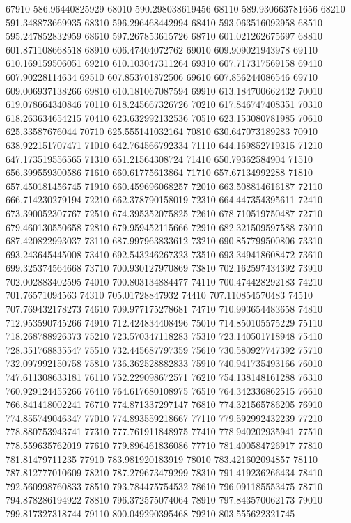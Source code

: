 {67910 586.96440825929
68010 590.298038619456
68110 589.930663781656
68210 591.348873669935
68310 596.296468442994
68410 593.063516092958
68510 595.247852832959
68610 597.267853615726
68710 601.021262675697
68810 601.871108668518
68910 606.47404072762
69010 609.909021943978
69110 610.169159506051
69210 610.103047311264
69310 607.717317569158
69410 607.90228114634
69510 607.853701872506
69610 607.856244086546
69710 609.006937138266
69810 610.181067087594
69910 613.184700662432
70010 619.078664340846
70110 618.245667326726
70210 617.846747408351
70310 618.263634654215
70410 623.632992132536
70510 623.153080781985
70610 625.33587676044
70710 625.555141032164
70810 630.647073189283
70910 638.922151707471
71010 642.764566792334
71110 644.169852719315
71210 647.173519556565
71310 651.21564308724
71410 650.79362584904
71510 656.399559300586
71610 660.61775613864
71710 657.67134992288
71810 657.450181456745
71910 660.459696068257
72010 663.508814616187
72110 666.714230279194
72210 662.378790158019
72310 664.447354395611
72410 673.390052307767
72510 674.395352075825
72610 678.710519750487
72710 679.460130550658
72810 679.959452115666
72910 682.321509597588
73010 687.420822993037
73110 687.997963833612
73210 690.857799500806
73310 693.243645445008
73410 692.543246267323
73510 693.349418608472
73610 699.325374564668
73710 700.930127970869
73810 702.162597434392
73910 702.002883402595
74010 700.803134884477
74110 700.474428292183
74210 701.76571094563
74310 705.01728847932
74410 707.110854570483
74510 707.769432178273
74610 709.977175278681
74710 710.993654483658
74810 712.953590745266
74910 712.424834408496
75010 714.850105575229
75110 718.268788926373
75210 723.570347118283
75310 723.140501718948
75410 728.351768835547
75510 732.445687797359
75610 730.580927747392
75710 732.097992150758
75810 736.362528882833
75910 740.941735493166
76010 747.611308633181
76110 752.229098672571
76210 754.138148161288
76310 760.929124455266
76410 764.617680108975
76510 764.342336862515
76610 766.841418002241
76710 774.871337297147
76810 774.321565786205
76910 774.855749046347
77010 774.893559218667
77110 779.592992432239
77210 778.880753943741
77310 777.761911848975
77410 778.940202935941
77510 778.559635762019
77610 779.896461836086
77710 781.400584726917
77810 781.81479711235
77910 783.981920183919
78010 783.421602094857
78110 787.812777010609
78210 787.279673479299
78310 791.419236266434
78410 792.560998760833
78510 793.784475754532
78610 796.091185553475
78710 794.878286194922
78810 796.372575074064
78910 797.843570062173
79010 799.817327318744
79110 800.049290395468
79210 803.555622321745
}
